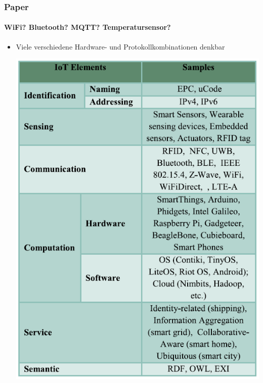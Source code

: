 \documentclass{beamer}
\begin{document}
\begin{frame}

\frametitle{Paper}
\framesubtitle{WiFi? Bluetooth? MQTT? Temperatursensor?}
\begin{itemize}
	\item Viele verschiedene Hardware- und Protokollkombinationen denkbar \begin{center}
		\includegraphics[scale=0.25]{images/iot_element.png}
	\end{center}
\end{itemize}

\end{frame}
\end{document}
